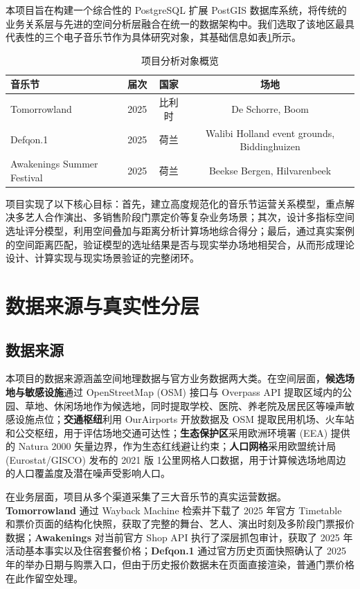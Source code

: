 \documentclass[11pt,a4paper,fontset=fandol]{ctexart}
\begin{document}
本项目旨在构建一个综合性的 PostgreSQL 扩展 PostGIS 数据库系统，将传统的业务关系层与先进的空间分析层融合在统一的数据架构中。我们选取了该地区最具代表性的三个电子音乐节作为具体研究对象，其基础信息如表\ref{tab:festivals}所示。

\begin{table}[H]
\centering
\caption{项目分析对象概览}
\label{tab:festivals}
\begin{tabular}{lccc}
\toprule
音乐节 & 届次 & 国家 & 场地 \\
\midrule
Tomorrowland & 2025 & 比利时 & De Schorre, Boom \\
Defqon.1 & 2025 & 荷兰 & Walibi Holland event grounds, Biddinghuizen \\
Awakenings Summer Festival & 2025 & 荷兰 & Beekse Bergen, Hilvarenbeek \\
\bottomrule
\end{tabular}

\end{table}

项目实现了以下核心目标：首先，建立高度规范化的音乐节运营关系模型，重点解决多艺人合作演出、多销售阶段门票定价等复杂业务场景；其次，设计多指标空间选址评分模型，利用空间叠加与距离分析计算场地综合得分；最后，通过真实案例的空间距离匹配，验证模型的选址结果是否与现实举办场地相契合，从而形成理论设计、计算实现与现实场景验证的完整闭环。

\section{数据来源与真实性分层}

\subsection{数据来源}

本项目的数据来源涵盖空间地理数据与官方业务数据两大类。在空间层面，\textbf{候选场地与敏感设施}通过 OpenStreetMap (OSM) 接口与 Overpass API 提取区域内的公园、草地、休闲场地作为候选地，同时提取学校、医院、养老院及居民区等噪声敏感设施点位；\textbf{交通枢纽}利用 OurAirports 开放数据及 OSM 提取民用机场、火车站和公交枢纽，用于评估场地交通可达性；\textbf{生态保护区}采用欧洲环境署 (EEA) 提供的 Natura 2000 矢量边界，作为生态红线避让约束；\textbf{人口网格}采用欧盟统计局 (Eurostat/GISCO) 发布的 2021 版 1公里网格人口数据，用于计算候选场地周边的人口覆盖度及潜在噪声受影响人口。

在业务层面，项目从多个渠道采集了三大音乐节的真实运营数据。\textbf{Tomorrowland} 通过 Wayback Machine 检索并下载了 2025 年官方 Timetable 和票价页面的结构化快照，获取了完整的舞台、艺人、演出时刻及多阶段门票报价数据；\textbf{Awakenings} 对当前官方 Shop API 执行了深层抓包审计，获取了 2025 年活动基本事实以及住宿套餐价格；\textbf{Defqon.1} 通过官方历史页面快照确认了 2025 年的举办日期与购票入口，但由于历史报价数据未在页面直接渲染，普通门票价格在此作留空处理。
\end{document}
